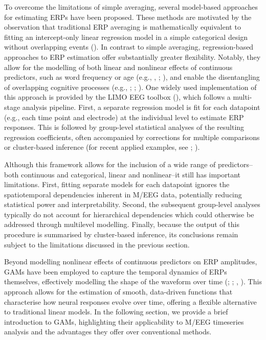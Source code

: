 \documentclass[
  doc,
  floatsintext,
  longtable,
  a4paper,
  nolmodern,
  notxfonts,
  notimes,
  colorlinks=true,linkcolor=blue,citecolor=blue,urlcolor=blue]{apa7}
\begin{document}
To overcome the limitations of simple averaging, several model-based
approaches for estimating ERPs have been proposed. These methods are
motivated by the observation that traditional ERP averaging is
mathematically equivalent to fitting an intercept-only linear regression
model in a simple categorical design without overlapping events
(). In contrast to
simple averaging, regression-based approaches to ERP estimation offer
substantially greater flexibility. Notably, they allow for the modelling
of both linear and nonlinear effects of continuous predictors, such as
word frequency or age (e.g., , ;
), and enable the
disentangling of overlapping cognitive processes (e.g.,
;
;
). One
widely used implementation of this approach is provided by the LIMO EEG
toolbox (), which follows
a multi-stage analysis pipeline. First, a separate regression model is
fit for each datapoint (e.g., each time point and electrode) at the
individual level to estimate ERP responses. This is followed by
group-level statistical analyses of the resulting regression
coefficients, often accompanied by corrections for multiple comparisons
or cluster-based inference (for recent applied examples, see
;
).

Although this framework allows for the inclusion of a wide range of
predictors--both continuous and categorical, linear and nonlinear--it
still has important limitations. First, fitting separate models for each
datapoint ignores the spatiotemporal dependencies inherent in M/EEG
data, potentially reducing statistical power and interpretability.
Second, the subsequent group-level analyses typically do not account for
hierarchical dependencies which could otherwise be addressed through
multilevel modelling. Finally, because the output of this procedure is
summarised by cluster-based inference, its conclusions remain subject to
the limitations discussed in the previous section.

Beyond modelling nonlinear effects of continuous predictors on ERP
amplitudes, GAMs have been employed to capture the temporal dynamics of
ERPs themselves, effectively modelling the shape of the waveform over
time (;
;
,
). This approach allows for the
estimation of smooth, data-driven functions that characterise how neural
responses evolve over time, offering a flexible alternative to
traditional linear models. In the following section, we provide a brief
introduction to GAMs, highlighting their applicability to M/EEG
timeseries analysis and the advantages they offer over conventional
methods.
\end{document}
